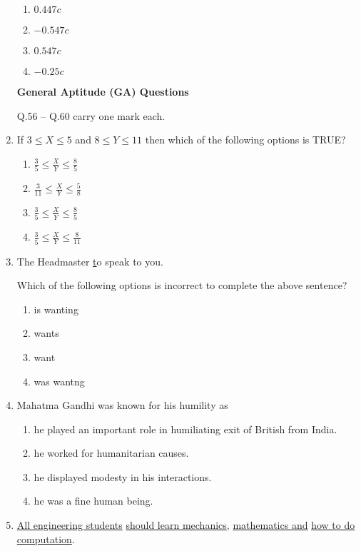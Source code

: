 \documentclass[journal]{IEEEtran}
\begin{document}
\begin{enumerate}
\begin{enumerate}
    \item $0.447c$
    \item $-0.547c$
    \item $0.547c$
    \item $-0.25c$\\
\end{enumerate}

\textbf{General Aptitude (GA) Questions}

Q.56 -- Q.60 carry one mark each.\\

\item If $3 \leq X \leq 5$ and $8 \leq Y \leq 11$ then which of the following options is TRUE?

\begin{enumerate}
    \item $\frac{3}{5} \leq \frac{X}{Y} \leq \frac{8}{5}$
    \item $\frac{3}{11} \leq \frac{X}{Y} \leq \frac{5}{8}$
    \item $\frac{3}{5} \leq \frac{X}{Y} \leq \frac{8}{5}$
    \item $\frac{3}{5} \leq \frac{X}{Y} \leq \frac{8}{11}$\\
\end{enumerate}

\item The Headmaster \underline to speak to you.

Which of the following options is incorrect to complete the above sentence?

\begin{enumerate}
    \item is wanting
    \item wants
    \item want
    \item was wantng\\
\end{enumerate}

\item Mahatma Gandhi was known for his humility as

\begin{enumerate}
    \item he played an important role in humiliating exit of British from India.
    \item he worked for humanitarian causes.
    \item he displayed modesty in his interactions.
    \item he was a fine human being.\\
\end{enumerate}
\item \underline{All engineering students} \underline{should learn mechanics}, \underline{mathematics and} \underline{how to do computation}.


\end{enumerate}
\end{document}
